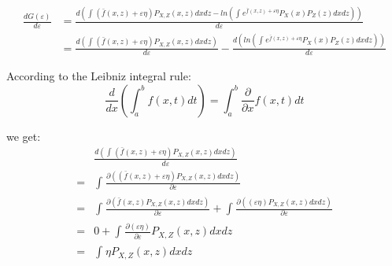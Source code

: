 \documentclass[UTF8]{article}
\begin{document}
\begin{equation}
   \begin{split}
       \label{eq_g}
   \frac{d G(\varepsilon)}{d \varepsilon}& = 
  \frac{d \left( \int_{}^{} ( \bar{f}(x,z)+\varepsilon \eta ) P_{X,Z}(x,z)dxdz - ln(\int_{}^{}e^{\bar{f}(x,z)+\varepsilon \eta}P_X(x)P_Z(z)dxdz) \right) }{d \varepsilon} \\
 & = \frac{d \left( \int_{}^{} ( \bar{f}(x,z)+\varepsilon \eta ) P_{X,Z}(x,z)dxdz \right) }{d \varepsilon} -  \frac{ d \left( ln(\int_{}^{}e^{\bar{f}(x,z)+\varepsilon \eta}P_X(x)P_Z(z)dxdz) \right)}{d \varepsilon}
 \end{split}
\end{equation}

According to the Leibniz integral rule:
\begin{equation}
\frac{d}{dx}\left( \int_{a}^{b}f(x,t)dt \right) = \int_{a}^{b}\frac{\partial}{\partial x}f(x,t)dt
\end{equation}

we get:
\begin{equation}
    \begin{split}
          & \frac{d \left( \int_{}^{} ( \bar{f}(x,z)+\varepsilon \eta ) P_{X,Z}(x,z)dxdz \right) }{d \varepsilon} \\
        = & \int_{}^{} \frac{\partial \left( ( \bar{f}(x,z)+\varepsilon \eta ) P_{X,Z}(x,z)dxdz \right)}{\partial \varepsilon} \\ 
        = & \int_{}^{} \frac{\partial \left( \bar{f}(x,z) P_{X,Z}(x,z)dxdz \right)}{\partial \varepsilon} + \int_{}^{} \frac{\partial \left( ( \varepsilon \eta ) P_{X,Z}(x,z)dxdz \right)}{\partial \varepsilon} \\ 
        = & 0 + \int_{}^{} \frac{\partial (\varepsilon \eta)}{\partial \varepsilon}    P_{X,Z}(x,z)dxdz  \\ 
        = & \int_{}^{}    \eta  P_{X,Z}(x,z)dxdz
    \end{split}
\end{equation}
\end{document}
